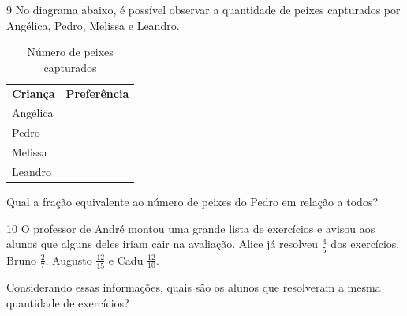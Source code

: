 \num{9} No diagrama abaixo, é possível observar a quantidade de peixes
capturados por Angélica, Pedro, Melissa e Leandro.

\renewcommand\MyCirc{
    \begin{tikzpicture}[scale=.3]
        \draw[fill=red!40] (1,1) to[bend left=50] (3,1) to[bend left=50] (1,1);
        \draw[fill=red!40] (3,1) -- (3.5,1.5) -- (3.3,1) -- (3.5,.5) -- cycle;
        \draw[fill=white] (1.6,1.1) circle (.15cm); 
        \draw[fill=blue] (1.55,1.1) circle (.05cm);         
    \end{tikzpicture}}

\begin{table}[!h]
\caption{Número de peixes capturados}
\begin{center}
\begin{tabular}{p{10ex}p{35ex}}
\textbf{Criança}   & \textbf{Preferência}\\
Angélica & \MyCirc \MyCirc \\
Pedro    & \MyCirc \MyCirc \MyCirc  \\
Melissa  & \MyCirc \MyCirc \MyCirc \MyCirc \MyCirc \\
Leandro  & \MyCirc \MyCirc \MyCirc \MyCirc \MyCirc \MyCirc 
\end{tabular}
\end{center}
\end{table}



\pagebreak
Qual a fração equivalente ao número de peixes do Pedro em relação a
todos?

\begin{emptybox}
\end{emptybox}

\num{10} O professor de André montou uma grande lista de exercícios 
e avisou aos alunos que alguns deles iriam cair na avaliação. Alice
já resolveu $\frac{4}{5}$ dos exercícios, Bruno $\frac{2}{7}$, Augusto 
$\frac{12}{15}$ e Cadu $\frac{12}{10}$.

Considerando essas informações, quais são os alunos que resolveram a mesma
quantidade de exercícios?

